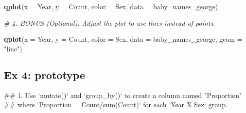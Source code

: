 \documentclass[]{book}
\newenvironment{Shaded}{\begin{snugshade}}{\end{snugshade}}
\newcommand{\KeywordTok}[1]{\textcolor[rgb]{0.13,0.29,0.53}{\textbf{#1}}}
\newcommand{\DataTypeTok}[1]{\textcolor[rgb]{0.13,0.29,0.53}{#1}}
\newcommand{\StringTok}[1]{\textcolor[rgb]{0.31,0.60,0.02}{#1}}
\newcommand{\CommentTok}[1]{\textcolor[rgb]{0.56,0.35,0.01}{\textit{#1}}}
\newcommand{\OperatorTok}[1]{\textcolor[rgb]{0.81,0.36,0.00}{\textbf{#1}}}
\newcommand{\NormalTok}[1]{#1}
\begin{document}
\begin{Shaded}
\begin{Highlighting}[]
\KeywordTok{qplot}\NormalTok{(}\DataTypeTok{x =}\NormalTok{ Year, }\DataTypeTok{y =}\NormalTok{ Count, }\DataTypeTok{color =}\NormalTok{ Sex, }\DataTypeTok{data =}\NormalTok{ baby_names_george)}
\end{Highlighting}
\end{Shaded}

\begin{Shaded}
\begin{Highlighting}[]
\CommentTok{# 4.  BONUS (Optional): Adjust the plot to use lines instead of points.}
\end{Highlighting}
\end{Shaded}

\begin{Shaded}
\begin{Highlighting}[]
\KeywordTok{qplot}\NormalTok{(}\DataTypeTok{x =}\NormalTok{ Year, }\DataTypeTok{y =}\NormalTok{ Count, }\DataTypeTok{color =}\NormalTok{ Sex, }\DataTypeTok{data =}\NormalTok{ baby_names_george, }\DataTypeTok{geom =} \StringTok{"line"}\NormalTok{)}
\end{Highlighting}
\end{Shaded}

\subsection{Ex 4: prototype}\label{ex-4-prototype}

\begin{Shaded}
\begin{Highlighting}[]
\NormalTok{## 1.  Use `mutate()` and `group_by()` to create a column named "Proportion"}
\NormalTok{##     where `Proportion = Count/sum(Count)` for each `Year X Sex` group.}
\end{Highlighting}
\end{Shaded}

\begin{Shaded}
\end{Shaded}
\end{document}

